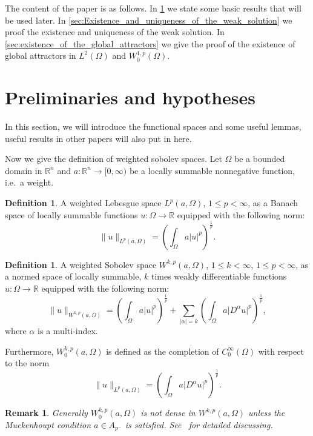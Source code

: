 \documentclass[11pt]{amsart}
\newtheorem{remark}[theorem]{Remark}
\theoremstyle{definition}
\newtheorem{definition}[theorem]{Definition}
\numberwithin{equation}{section}
\newcommand*\abs[1]{\lvert#1\rvert}
\newcommand*\norm[1]{\lVert#1\rVert}
\newcommand\R{\mathbb{R}}
\begin{document}
The content of the paper is as follows.
In \cref{sec:preliminaries}
we state some basic results that will be used later. In
\cref{sec:Existence_and_uniqueness_of_the_weak_solution}
we proof the existence and uniqueness of the weak solution.
In \cref{sec:existence_of_the_global_attractors}
we give the proof of the existence of global attractors in
$L^2(\Omega)$ and $W_0^{1,p}(\Omega)$.
\section{Preliminaries and hypotheses}\label{sec:preliminaries}
In this section, we will introduce the functional spaces and some
useful lemmas, useful results in other papers will also put in here.

Now we give the definition of weighted sobolev spaces.
Let $\Omega$ be a bounded domain in $\R^n$ and
$a \colon \R^n \to [0, \infty)$
be a locally summable nonnegative function, i.e.\ a weight.
\begin{definition}
	A weighted Lebesgue space $L^p(a, \Omega)$, $1 \leq p < \infty$,
	as a Banach space of locally summable functions
	$u \colon \Omega \to \R$ equipped with the following norm:
	\begin{equation}
		\norm{u}_{L^p(a,\Omega)} =
		\left( \int_{\Omega}a\abs{u}^p \right)^{\frac{1}{p}}.
	\end{equation}
\end{definition}
\begin{definition}
	A weighted Sobolev space $W^{k,p}(a,\Omega)$,
	$1 \leq k < \infty$, $1 \leq p < \infty$,
	as a normed space of locally summable, $k$ times weakly
	differentiable functions $u \colon \Omega \to \R$ equipped with the following norm:
	\begin{equation}
		\norm{u}_{W^{k,p}(a,\Omega)} =
		\left( \int_{\Omega}a\abs{u}^p \right)^{\frac{1}{p}}
		+ \sum_{\abs{\alpha}=k}
		\left( \int_{\Omega}a\abs{D^{\alpha}u}^p \right)^{\frac{1}{p}},
	\end{equation}
	where $\alpha$ is a multi-index.
	
	Furthermore,
	$W_0^{k,p}(a,\Omega)$ is defined as the completion of
	$C_0^{\infty}(\Omega)$ with respect to the norm
	\begin{equation}
		\norm{u}_{L^p(a,\Omega)} =
		\left( \int_{\Omega}a\abs{D^{\alpha}u}^p \right)^{\frac{1}{p}}.
	\end{equation}
\end{definition}
\begin{remark}
	Generally $W_0^{k,p}(a,\Omega)$ is not dense in
	$W^{k,p}(a,\Omega)$ unless the Muckenhoupt condition $a \in A_{p^-}$ is satisfied. See~\cite{goldshteinWeightedSobolevSpaces2009} for detailed discussing.
\end{remark}
\end{document}
